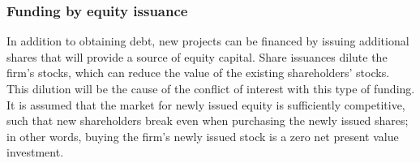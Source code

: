 \documentclass[../main.tex]{subfiles}
\begin{document}
    \subsubsection{Funding by equity issuance}
        In addition to obtaining debt, new projects can be financed by issuing additional shares
        that will provide a source of equity capital.
        Share issuances dilute the firm's stocks, which can reduce the value of the existing shareholders' stocks.
        This dilution will be the cause of the conflict of interest with this type of funding.
        It is assumed that the market for newly issued equity is sufficiently competitive,
        such that new shareholders break even when purchasing the newly issued shares;
        in other words, buying the firm's newly issued stock is a zero net present value investment.
\end{document}
